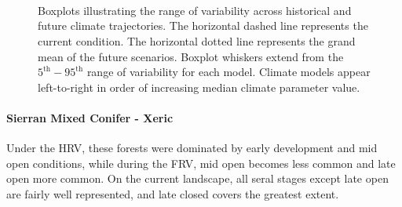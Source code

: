 \documentclass[12pt]{article}
\begin{document}
\begin{spacing}{1}
\begin{figure}[htbp]
  \centering
   \\
   \\
     \\
    \caption{Boxplots illustrating the range of variability across historical and future climate trajectories. The horizontal dashed line represents the current condition. The horizontal dotted line represents the grand mean of the future scenarios. Boxplot whiskers extend from the $5^{\text{th}} - 95^{\text{th}}$ range of variability for each model. Climate models appear left-to-right in order of increasing median climate parameter value.}
  \label{fig:covcond_smcm}
\end{figure} %


\paragraph{Sierran Mixed Conifer - Xeric} 
Under the HRV, these forests were dominated by early development and mid open conditions, while during the FRV, mid open becomes less common and late open more common. On the current landscape, all seral stages except late open are fairly well represented, and late closed covers the greatest extent.


\end{spacing}
\end{document}
